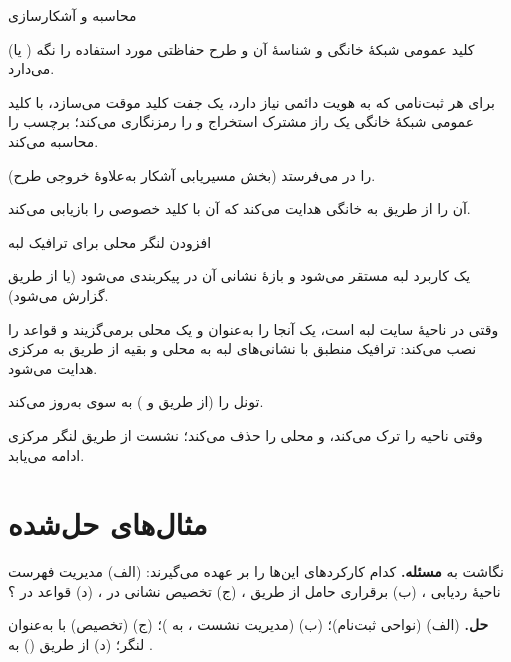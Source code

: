 \documentclass[11pt,a4paper]{article}
\begin{document}
\begin{procedurebox}{محاسبه و آشکارسازی }\label{proc:suci}
\begin{steps}
  \item {} (یا ) کلید عمومی شبکهٔ خانگی و شناسهٔ آن و طرح حفاظتی مورد استفاده را نگه می‌دارد.
  \item برای هر ثبت‌نامی که به هویت دائمی نیاز دارد،  یک جفت کلید موقت می‌سازد، با کلید عمومی شبکهٔ خانگی یک راز مشترک
        استخراج و  را رمزنگاری می‌کند؛ برچسب  را محاسبه می‌کند.
  \item {}  (بخش مسیریابی آشکار به‌علاوهٔ خروجی طرح) را در  می‌فرستد.
  \item {} آن را از طریق  به  خانگی هدایت می‌کند که  آن با کلید خصوصی  را بازیابی
        می‌کند.
\end{steps}
\end{procedurebox}

\begin{procedurebox}{افزودن لنگر محلی برای ترافیک لبه}\label{proc:ulcl}
\begin{steps}
  \item یک کاربرد لبه مستقر می‌شود و بازهٔ نشانی آن در  پیکربندی می‌شود (یا از طریق  گزارش می‌شود).
  \item وقتی  در ناحیهٔ سایت لبه است،  یک  آنجا را به‌عنوان  و یک  محلی برمی‌گزیند و
        قواعد  را نصب می‌کند: ترافیک منطبق با نشانی‌های لبه به  محلی و بقیه از طریق  به  مرکزی
        هدایت می‌شود.
  \item {} تونل   را (از طریق  و ) به سوی  به‌روز می‌کند.
  \item وقتی  ناحیه را ترک می‌کند،   و  محلی را حذف می‌کند؛ نشست از طریق لنگر مرکزی ادامه
        می‌یابد.
\end{steps}
\end{procedurebox}

\section{مثال‌های حل‌شده}

\begin{examplebox}{نگاشت  به }\label{ex:map}
\textbf{مسئله.} کدام کارکردهای  این‌ها را بر عهده می‌گیرند: (الف) مدیریت فهرست ناحیهٔ ردیابی ، (ب) برقراری
حامل  از طریق ، (ج) تخصیص نشانی  در ، (د) قواعد  در ؟

\textbf{حل.} (الف)  (نواحی ثبت‌نام)؛ (ب)  (مدیریت نشست ،  به )؛ (ج) 
(تخصیص) با  به‌عنوان لنگر؛ (د)  از طریق  () به .
\end{examplebox}
\end{document}
